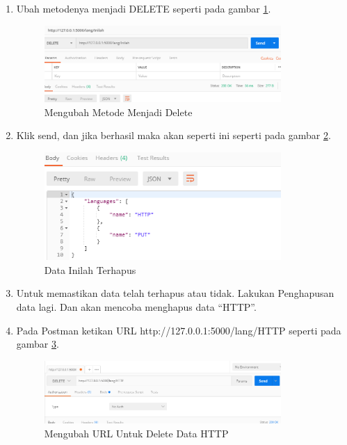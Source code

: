 \begin{enumerate}
\item Ubah metodenya menjadi DELETE seperti pada gambar \ref{fig:umd}.
\begin{figure}[!htbp]
	\centerline{\includegraphics[width=0.85\textwidth]{figures/11/umd.PNG}}
	\caption{Mengubah Metode Menjadi Delete}
	\label{fig:umd}
\end{figure}
 
\item Klik send, dan jika berhasil maka akan seperti ini seperti pada gambar \ref{fig:dt}.
\begin{figure}[!htbp]
	\centerline{\includegraphics[width=0.85\textwidth]{figures/11/dt.PNG}}
	\caption{Data Inilah Terhapus}
	\label{fig:dt}
\end{figure}
 
\item Untuk memastikan data telah terhapus atau tidak. Lakukan Penghapusan data lagi. Dan akan mencoba menghapus data “HTTP”.
\item Pada Postman ketikan URL http://127.0.0.1:5000/lang/HTTP seperti pada gambar \ref{fig:udh}.
\begin{figure}[!htbp]
	\centerline{\includegraphics[width=0.85\textwidth]{figures/11/udh.PNG}}
	\caption{Mengubah URL Untuk Delete Data HTTP}
	\label{fig:udh}
\end{figure}


\end{enumerate}
